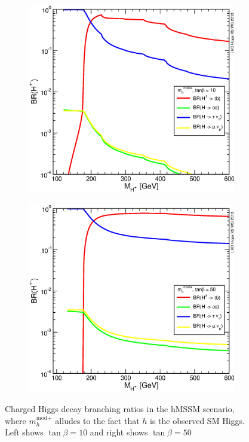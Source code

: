 \begin{figure}[!h]
\begin{subfigure}{0.5\textwidth}
   \includegraphics[width=\textwidth]{figures/YRHXS3_BR_fig33.eps}
\end{subfigure} %
\begin{subfigure}{0.5\textwidth}
   \includegraphics[width=\textwidth]{figures/YRHXS3_BR_fig34.eps}
\end{subfigure}
\caption{Charged Higgs decay branching ratios in the hMSSM scenario, where $m_h^{\text{mod+}}$ alludes to 
the fact that $h$ is the observed SM Higgs. Left shows $\tan\beta=10$ and right shows $\tan\beta=50$}
\label{fig:BR_chargedH}
\end{figure}
